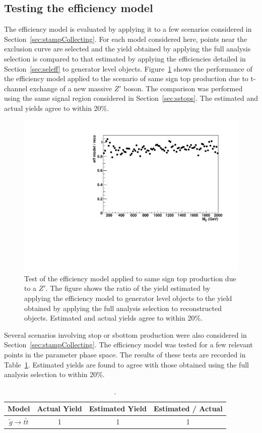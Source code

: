 \subsection{Testing the efficiency model}
\label{sec:outreachtest}

The efficiency model is evaluated by applying it to a few scenarios considered in Section~\ref{sec:stampCollecting}.  For each model considered here, points near the exclusion curve are selected and the yield obtained by applying the full analysis selection is compared to that estimated by applying the efficiencies detailed in Section~\ref{sec:seleff} to generator level objects.  Figure~\ref{fig:zprimeefftest} shows the performance of the efficiency model applied to the scenario of same sign top production due to t-channel exchange of a new massive $Z'$ boson.  The comparison was performed using the same signal region considered in Section~\ref{sec:sstops}.  The estimated and actual yields agree to within 20\%.

\begin{figure}[htb]
\begin{center}
\includegraphics[width=0.95\linewidth]{figs/zprime_eff_test.pdf}
\caption{Test of the efficiency model applied to same sign top production due to a $Z'$.  The figure shows the ratio of the yield estimated by applying the efficiency model to generator level objects to the yield obtained by applying the full analysis selection to reconstructed objects.  Estimated and actual yields agree to within 20\%.
\label{fig:zprimeefftest}}
\end{center}
\end{figure}

Several scenarios involving stop or sbottom production were also considered in Section~\ref{sec:stampCollecting}.  The efficiency model was tested for a few relevant points in the parameter phase space.  The results of these tests are recorded in Table~\ref{tab:efftest}.  Estimated yields are found to agree with those obtained using the full analysis selection to within 20\%.

\begin{table}
\begin{center}
\begin{tabular}{c | c c c}
\hline\hline
Model & Actual Yield &  Estimated Yield & Estimated / Actual \\
\hline
$\widetilde{g} \to t\widetilde{t}$ & 1 & 1 & 1 \\
\hline\hline
\end{tabular}
\caption{\label{tab:efftest} .}
\end{center}
\end{table}